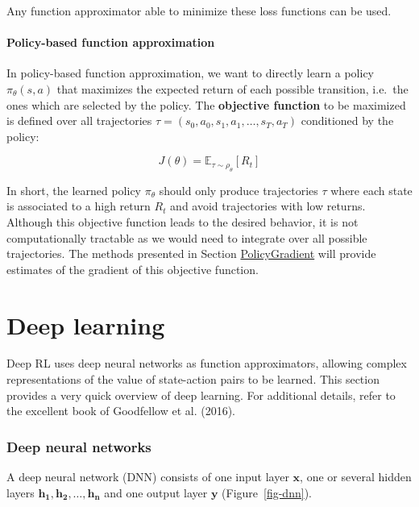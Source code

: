 \documentclass[
  letterpaper,
  DIV=11,
  numbers=noendperiod]{scrreprt}
\begin{document}
Any function approximator able to minimize these loss functions can be
used.

\hypertarget{policy-based-function-approximation}{%
\subsubsection*{Policy-based function
approximation}\label{policy-based-function-approximation}}

In policy-based function approximation, we want to directly learn a
policy \(\pi_\theta(s, a)\) that maximizes the expected return of each
possible transition, i.e.~the ones which are selected by the policy. The
\textbf{objective function} to be maximized is defined over all
trajectories \(\tau = (s_0, a_0, s_1, a_1, \ldots, s_T, a_T)\)
conditioned by the policy:

\[
    J(\theta) = \mathbb{E}_{\tau \sim \rho_\theta} [R_t]
\]

In short, the learned policy \(\pi_\theta\) should only produce
trajectories \(\tau\) where each state is associated to a high return
\(R_t\) and avoid trajectories with low returns. Although this objective
function leads to the desired behavior, it is not computationally
tractable as we would need to integrate over all possible trajectories.
The methods presented in Section
\protect\hyperlink{policy-gradient-methods}{PolicyGradient} will provide
estimates of the gradient of this objective function.


\hypertarget{deep-learning}{%
\chapter{Deep learning}\label{deep-learning}}

Deep RL uses deep neural networks as function approximators, allowing
complex representations of the value of state-action pairs to be
learned. This section provides a very quick overview of deep learning.
For additional details, refer to the excellent book of Goodfellow et al.
(2016).

\hypertarget{deep-neural-networks}{%
\subsection{Deep neural networks}\label{deep-neural-networks}}

A deep neural network (DNN) consists of one input layer \(\mathbf{x}\),
one or several hidden layers
\(\mathbf{h_1}, \mathbf{h_2}, \ldots, \mathbf{h_n}\) and one output
layer \(\mathbf{y}\) (Figure~\ref{fig-dnn}).
\end{document}
